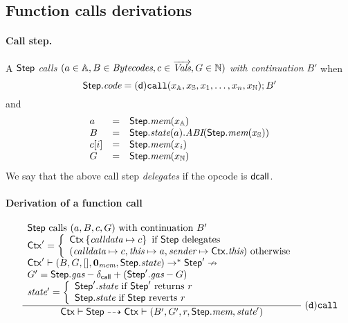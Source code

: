 \subsection{Function calls derivations}

\paragraph{Call step.}
A $\mathsf{Step}$ \emph{calls $(a\in\mathbb{A},B\in\textit{Bytecodes},c\in\overrightarrow{\textit{Vals}},G\in\mathbb{N})$ with continuation} $B'$ when
$$
\mathsf{Step}.\textit{code} = \mathsf{(d)}\mathtt{call}(x_{\mathbb{A}},x_{\mathbb{S}},x_1,\dots,x_n, x_{\mathbb{N}});B'
$$
and
$$
\begin{array}{lll}
a&=&\mathsf{Step}.\textit{mem}(x_{\mathbb{A}}) \\
B&=&\mathsf{Step}.\textit{state}(a).\textit{ABI}(\mathsf{Step}.\textit{mem}(x_{\mathbb{S}})) \\
c[i]&=&\mathsf{Step}.\textit{mem}(x_i) \\
G&=&\mathsf{Step}.\textit{mem}(x_{\mathbb{N}})
\end{array}
$$
We say that the above call step \emph{delegates} if the opcode is ${\sf dcall}$.

\paragraph{Derivation of a function call}

$$
\dfrac{
	\begin{array}{l}
	\textrm{$\mathsf{Step}$ calls $(a,B,c,G)$ with continuation $B'$} \\
	\mathsf{Ctx}' = \left\{\begin{array}{l}
	\mathsf{Ctx}\left\{\textit{calldata}\mapsto c\right\} \textrm{ if $\mathsf{Step}$ delegates}\\
	(\textit{calldata}\mapsto c,\textit{this}\mapsto a,\textit{sender}\mapsto\mathsf{Ctx}.\textit{this}) \textrm{ otherwise}\\
	\end{array}\right. \\
	\mathsf{Ctx}'\vdash (B,G,[],\mathbf{0}_{\textit{mem}},\mathsf{Step}.\textit{state})\to^* \mathsf{Step}' \nrightarrow \\
	G' = \mathsf{Step}.\textit{gas}-\delta_{\mathsf{call}}+(\mathsf{Step}'.\textit{gas}-G) \\
	\textit{state}' =\left\{
    \begin{array}{l}
        \textrm{$\mathsf{Step}'.\textit{state}$ if $\mathsf{Step}'$ returns $r$}\\
        \textrm{$\mathsf{Step}.\textit{state}$ if $\mathsf{Step}$ reverts $r$}
    \end{array}\right.
	\end{array}
}
{\mathsf{Ctx}\vdash\mathsf{Step} \dashrightarrow \mathsf{Ctx}\vdash (B',G' ,r,\mathsf{Step}.\textit{mem},\textit{state}')}\;\mathtt{(d)call}
$$

